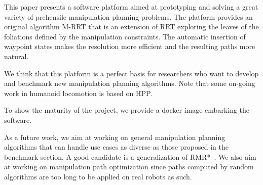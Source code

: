 This paper presents a software platform aimed at prototyping and
solving a great variety of prehensile manipulation planning
problems. The platform provides an original algorithm M-RRT that is an
extension of RRT exploring the leaves of the foliations defined by the
manipulation constraints. The automatic insertion of waypoint states
makes the resolution more efficient and the resulting paths more
natural.

We think that this platform is a perfect basis for researchers who want to
develop and benchmark new manipulation planning algorithms. Note that some
on-going work in humanoid locomotion  \cite{tonneau-2018} is based on HPP.

To show the maturity of the project, we provide a docker image embarking the
software.

As a future work, we aim at working on general manipulation planning algorithms
that can handle use cases as diverse as those proposed in the benchmark section.
A good candidate is a generalization of RMR*~\cite{schmitt17icra}. We also aim at working on manipulation path optimization since paths computed by
random algorithms are too long to be applied on real robots as such.

